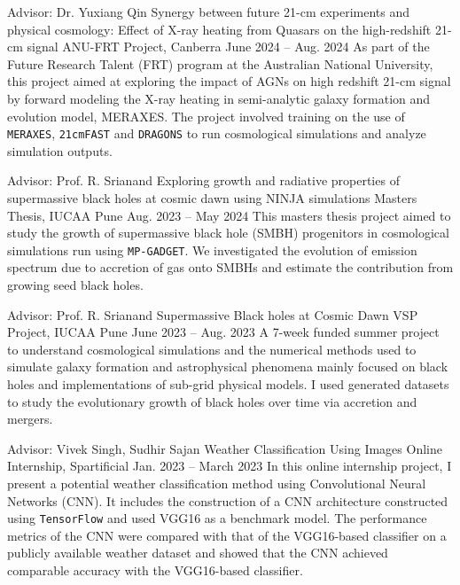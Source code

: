 \begin{cventries}

    \cventry
    {Advisor: Dr. Yuxiang Qin} %
    {Synergy between future 21-cm experiments and physical cosmology: Effect of X-ray heating from Quasars on the high-redshift 21-cm signal} %
    {ANU-FRT Project, Canberra} %
    {June 2024 -- Aug. 2024} %
    { %
        As part of the Future Research Talent (FRT) program at the Australian National University, this project aimed at exploring the impact of AGNs on high redshift 21-cm signal by forward modeling the X-ray heating in semi-analytic galaxy formation and evolution model, MERAXES. The project involved training on the use of \texttt{MERAXES}, \texttt{21cmFAST} and \texttt{DRAGONS} to run cosmological simulations and analyze simulation outputs.
    }

    \vspace{1mm}

    \cventry
    {Advisor: Prof. R. Srianand} %
    {Exploring growth and radiative properties of supermassive black holes at cosmic dawn using NINJA simulations} %
    {Masters Thesis, IUCAA Pune} %
    {Aug. 2023 -- May 2024} %
    { %
        This masters thesis project aimed to study the growth of supermassive black hole (SMBH) progenitors in cosmological simulations run using \texttt{MP-GADGET}. We investigated the evolution of emission spectrum due to accretion of gas onto SMBHs and estimate the contribution from growing seed black holes.
    }

    \vspace{1mm}

    \cventry
    {Advisor: Prof. R. Srianand} %
    {Supermassive Black holes at Cosmic Dawn} %
    {VSP Project, IUCAA Pune} %
    {June 2023 -- Aug. 2023} %
    { %
        A 7-week funded summer project to understand cosmological simulations and the numerical methods used to simulate galaxy formation and astrophysical phenomena mainly focused on black holes and implementations of sub-grid physical models. I used generated datasets to study the evolutionary growth of black holes over time via accretion and mergers.
    }

    \vspace{1mm}

    \cventry
    {Advisor: Vivek Singh, Sudhir Sajan} %
    {Weather Classification Using Images} %
    {Online Internship, Spartificial} %
    {Jan. 2023 -- March 2023} %
    { %
        In this online internship project, I present a potential weather classification method using Convolutional Neural Networks (CNN). It includes the construction of a CNN architecture constructed using \texttt{TensorFlow} and used VGG16 as a benchmark model. The performance metrics of the CNN were compared with that of the VGG16-based classifier on a publicly available weather dataset and showed that the CNN achieved comparable accuracy with the VGG16-based classifier.
    }


\end{cventries}
